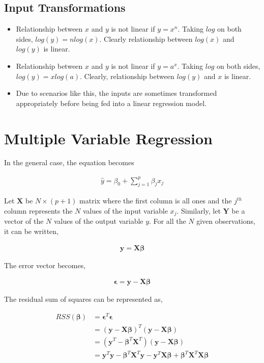 \documentclass[11pt, a4paper]{article}
\begin{document}
\subsection{Input Transformations}

\begin{itemize}
	\item Relationship between $x$ and $y$ is not linear if $y = x^n$. Taking $log$ on both sides, $log(y) = nlog(x)$. Clearly relationship between $log(x)$ and $log(y)$ is linear. 
	\item Relationship between $x$ and $y$ is not linear if $y = a^x$. Taking $log$ on both sides, $log(y) = xlog(a)$. Clearly, relationship between $log(y)$ and $x$ is linear.
	\item Due to scenarios like this, the inputs are sometimes transformed appropriately before being fed into a linear regression model.
\end{itemize}
 
\section{Multiple Variable Regression} 

In the general case, the equation becomes

\begin{align*}
    \hat{y} = \beta_0 + \sum\limits_{j = 1}^p \beta_j x_j
\end{align*}

Let $\mathbf{X}$ be $N\times(p+1)$ matrix where the first column is all ones and the $j^{th}$ column represents the $N$ values of the input variable $x_j$. Similarly, let $\mathbf{Y}$ be a vector of the $N$ values of the output variable $y$. For all the $N$ given observations, it can be written,

\begin{align*}
    \mathbf{y} = \mathbf{X}\boldsymbol{\beta}
\end{align*} 

The error vector becomes,

\begin{align*}
    \mathbf{\epsilon} = \mathbf{y} - \mathbf{X}\boldsymbol{\beta}
\end{align*}

The residual sum of squares can be represented as,

\begin{align*}
    RSS(\boldsymbol{\beta}) &= \mathbf{\epsilon}^T\mathbf{\epsilon} \\
    &= (\mathbf{y} - \mathbf{X}\boldsymbol{\beta})^T(\mathbf{y} - \mathbf{X}\boldsymbol{\beta}) \\
    &= (\mathbf{y}^T - \boldsymbol{\beta}^T\mathbf{X}^T)(\mathbf{y} - \mathbf{X}\boldsymbol{\beta}) \\
    &= \mathbf{y}^T\mathbf{y} - \boldsymbol{\beta}^T\mathbf{X}^T\mathbf{y} - \mathbf{y}^T\mathbf{X}\boldsymbol{\beta} + \boldsymbol{\beta}^T\mathbf{X}^T\mathbf{X}\boldsymbol{\beta} 
\end{align*}
\end{document}
